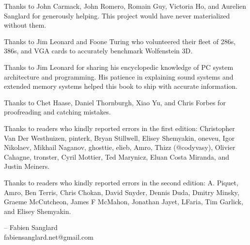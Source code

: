 Thanks to John Carmack, John Romero, Romain Guy, Victoria Ho, and Aurelien Sanglard for generously helping. This project would have never
materialized without them.\\ 
\par
Thanks to  Jim Leonard and Foone Turing who volunteered their fleet of 286s, 386s, and VGA cards to accurately benchmark Wolfenstein 3D.\\
\par
Thanks to  Jim Leonard for sharing his encyclopedic knowledge of PC system architecture and programming. His patience in explaining sound systems and extended memory systems helped this book to ship with accurate information.\\
\par
Thanks to  Chet Haase, Daniel Thornburgh, Xiao Yu, and Chris Forbes for proofreading and catching mistakes.\\
\par
Thanks to readers who kindly reported errors in the first edition: Christopher Van Der Westhuizen, pinterk, Bryan Stillwell, Elisey Shemyakin, oneveu, Igor Nikolaev, Mikhail Naganov, ghosttie, elieb, Amro, Thizz (@codyvasy), Olivier Cahagne, tronster, Cyril Mottier, Ted Marynicz, 
Eluan Costa Miranda, and Justin Meiners.\\
\par
Thanks to readers who kindly reported errors in the second edition: A. Piquet, Amro, Ben Terris, Chris Chokan, David Snyder, Dennis Duda, Dmitry Minsky, Graeme McCutcheon, James F McMahon, Jonathan Jayet, LFaria, Tim Garlick, and Elisey Shemyakin.\\
\par
-- Fabien Sanglard\\
fabiensanglard.net@gmail.com
\thispagestyle{plain} %
